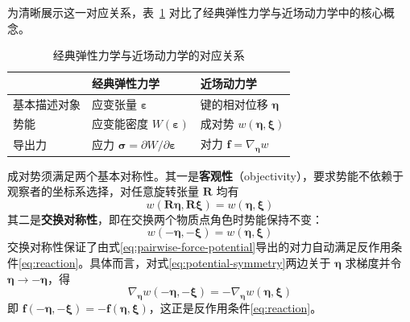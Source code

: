 为清晰展示这一对应关系，表~\ref{tab:classical-peridynamics} 对比了经典弹性力学与近场动力学中的核心概念。

\begin{table}[htbp]
  \centering
  \small
  \caption{经典弹性力学与近场动力学的对应关系}
  \label{tab:classical-peridynamics}
  \begin{tabular}{>{\raggedright\arraybackslash}p{}>{\raggedright\arraybackslash}p{}>{\raggedright\arraybackslash}p{}}
    \toprule
    & 经典弹性力学 & 近场动力学 \\
    \midrule
    基本描述对象 & 应变张量 $\boldsymbol{\varepsilon}$ & 键的相对位移 $\boldsymbol{\eta}$ \\
    势能 & 应变能密度 $W(\boldsymbol{\varepsilon})$ & 成对势 $w(\boldsymbol{\eta},\boldsymbol{\xi})$ \\
    导出力 & 应力 $\boldsymbol{\sigma}=\partial W/\partial\boldsymbol{\varepsilon}$ & 对力 $\mathbf{f}=\nabla_{\boldsymbol{\eta}} w$ \\
    \bottomrule
  \end{tabular}
\end{table}

成对势须满足两个基本对称性。其一是\textbf{客观性}（objectivity），要求势能不依赖于观察者的坐标系选择，对任意旋转张量 $\mathbf{R}$ 均有
\begin{equation}
  w(\mathbf{R}\boldsymbol{\eta},\mathbf{R}\boldsymbol{\xi})=w(\boldsymbol{\eta},\boldsymbol{\xi})
  \label{eq:potential-objectivity}
\end{equation}
其二是\textbf{交换对称性}，即在交换两个物质点角色时势能保持不变：
\begin{equation}
  w(-\boldsymbol{\eta},-\boldsymbol{\xi})=w(\boldsymbol{\eta},\boldsymbol{\xi})
  \label{eq:potential-symmetry}
\end{equation}
交换对称性保证了由式\eqref{eq:pairwise-force-potential}导出的对力自动满足反作用条件\eqref{eq:reaction}。具体而言，对式\eqref{eq:potential-symmetry}两边关于 $\boldsymbol{\eta}$ 求梯度并令 $\boldsymbol{\eta}\to-\boldsymbol{\eta}$，得
\begin{equation}
  \nabla_{\boldsymbol{\eta}} w(-\boldsymbol{\eta},-\boldsymbol{\xi}) = -\nabla_{\boldsymbol{\eta}} w(\boldsymbol{\eta},\boldsymbol{\xi})
  \label{eq:reaction-from-symmetry}
\end{equation}
即 $\mathbf{f}(-\boldsymbol{\eta},-\boldsymbol{\xi})=-\mathbf{f}(\boldsymbol{\eta},\boldsymbol{\xi})$，这正是反作用条件\eqref{eq:reaction}。

